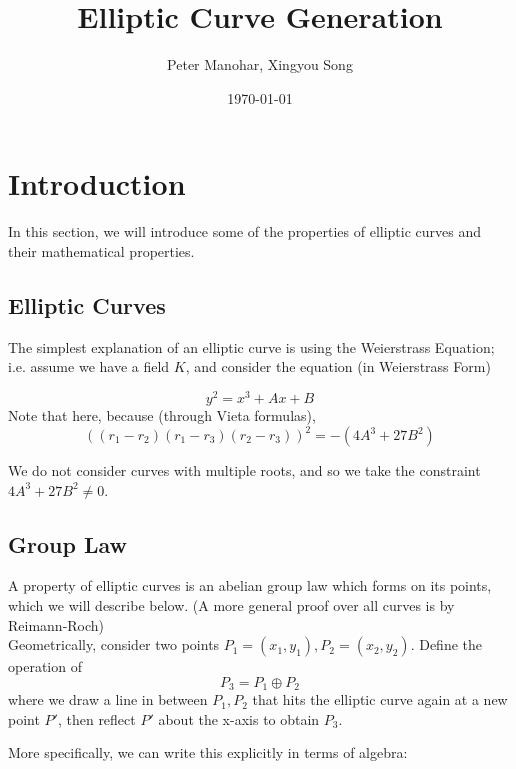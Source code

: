 \documentclass[12pt,twoside]{article}
\title{Elliptic Curve Generation }
\date{\today}
\author{ Peter Manohar, Xingyou Song}
\begin{document}
\maketitle


\tableofcontents

\section{Introduction}
In this section, we will introduce some of the properties of elliptic curves and their mathematical properties.

\subsection{Elliptic Curves} 
The simplest explanation of an elliptic curve is using the Weierstrass Equation; i.e. assume we have a field $K$, and consider the equation (in Weierstrass Form)

\begin{equation}
y^{2} = x^{3} + Ax + B 
\end{equation}
Note that here, because (through Vieta formulas),
\begin{equation} 
((r_{1} - r_{2})(r_{1} - r_{3})(r_{2} - r_{3}))^{2} = - (4A^{3} + 27B^{2})
\end{equation}

We do not consider curves with multiple roots, and so we take the constraint $4A^{3} + 27B^{2} \neq 0$. 


\subsection{Group Law} 
A property of elliptic curves is an abelian group law which forms on its points, which we will describe below. (A more general proof over all curves is by Reimann-Roch) \\
Geometrically, consider two points $P_{1} = (x_{1}, y_{1}), P_{2} = (x_{2}, y_{2})$. 
Define the operation of 
\begin{equation} 
P_{3} = P_{1} \oplus P_{2} 
\end{equation} 
where we draw a line in between $P_{1},P_{2}$ that hits the elliptic curve again at a new point $P'$, then reflect $P'$ about the x-axis to obtain $P_{3}$. 

More specifically, we can write this explicitly in terms of algebra: 
\end{document}
